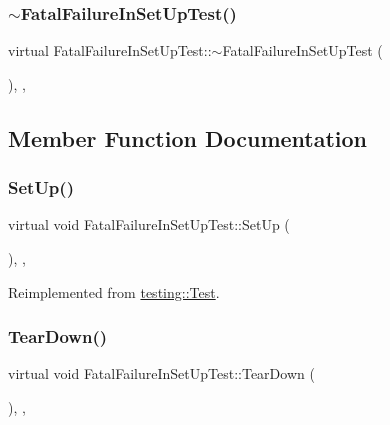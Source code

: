 \subsubsection{\texorpdfstring{$\sim$FatalFailureInSetUpTest()}{~FatalFailureInSetUpTest()}}
{\footnotesize\ttfamily virtual Fatal\+Failure\+In\+Set\+Up\+Test\+::$\sim$\+Fatal\+Failure\+In\+Set\+Up\+Test (\begin{DoxyParamCaption}{ }\end{DoxyParamCaption})\hspace{0.3cm}{\ttfamily [inline]}, {\ttfamily [protected]}, {\ttfamily [virtual]}}



\subsection{Member Function Documentation}
\mbox{\label{classFatalFailureInSetUpTest_a455696f86fb5f5393624221ccb79b373}} 
\subsubsection{\texorpdfstring{SetUp()}{SetUp()}}
{\footnotesize\ttfamily virtual void Fatal\+Failure\+In\+Set\+Up\+Test\+::\+Set\+Up (\begin{DoxyParamCaption}{ }\end{DoxyParamCaption})\hspace{0.3cm}{\ttfamily [inline]}, {\ttfamily [protected]}, {\ttfamily [virtual]}}



Reimplemented from \mbox{\hyperlink{classtesting_1_1Test_a190315150c303ddf801313fd1a777733}{testing\+::\+Test}}.

\mbox{\label{classFatalFailureInSetUpTest_a457707161063e08f7b6600ec5db449e4}} 
\subsubsection{\texorpdfstring{TearDown()}{TearDown()}}
{\footnotesize\ttfamily virtual void Fatal\+Failure\+In\+Set\+Up\+Test\+::\+Tear\+Down (\begin{DoxyParamCaption}{ }\end{DoxyParamCaption})\hspace{0.3cm}{\ttfamily [inline]}, {\ttfamily [protected]}, {\ttfamily [virtual]}}



